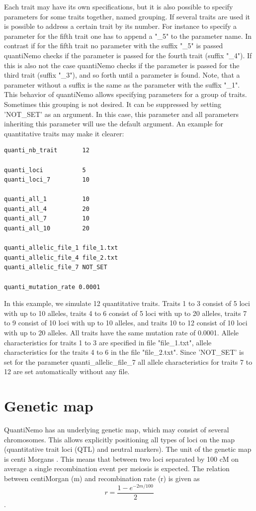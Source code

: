 \documentclass[letterpaper,12pt,oneside]{book}
\begin{document}
Each trait may have its own specifications, but it is also possible to specify parameters for some traits together, named grouping. If several traits are used it is possible to address a certain trait by its number. For instance to specify a parameter for the fifth trait one has to append a \textsf{"\_5"} to the parameter name. In contrast if for the fifth trait no parameter with the suffix \textsf{"\_5"} is passed quantiNemo checks if the parameter is passed for the fourth trait (suffix \textsf{"\_4"}). If this is also not the case quantiNemo checks if the parameter is passed for the third trait (suffix \textsf{"\_3"}), and so forth until a parameter is found. Note, that a parameter without a suffix is the same as the parameter with the suffix  \textsf{"\_1"}. This behavior of quantiNemo allows specifying parameters for a group of traits. Sometimes this grouping is not desired. It can be suppressed by setting 'NOT\_SET' as an argument. In this case, this parameter and all parameters inheriting this parameter will use the default argument. An example for quantitative traits may make it clearer:
\begin{lstlisting}[frame=single]
quanti_nb_trait       12
    
quanti_loci           5
quanti_loci_7         10

quanti_all_1          10
quanti_all_4          20
quanti_all_7          10
quanti_all_10         20

quanti_allelic_file_1 file_1.txt  
quanti_allelic_file_4 file_2.txt  
quanti_allelic_file_7 NOT_SET  

quanti_mutation_rate 0.0001
\end{lstlisting} 
In this example, we simulate 12 quantitative traits. Traits 1 to 3 consist of 5 loci with up to 10 alleles, traits 4 to 6 consist of 5 loci with up to 20 alleles, traits 7 to 9 consist of 10 loci with up to 10 alleles, and traits 10 to 12 consist of 10 loci with up to 20 alleles. All traits have the same mutation rate of 0.0001. Allele characteristics for traits 1 to 3 are specified in file "file\_1.txt", allele characteristics for the traits 4 to 6 in the file "file\_2.txt". Since 'NOT\_SET' is set for the parameter \textsf{ quanti\_allelic\_file\_7} all allele characteristics for traits 7 to 12 are set automatically without any file. \\

\section{Genetic map}\label{sec:geneticMap}
QuantiNemo has an underlying genetic map, which may consist of several chromosomes. This allows
explicitly positioning all types of loci on the map (quantitative trait loci (QTL) and neutral
markers). The unit of the genetic map is centi Morgans \citep[cM]{Haldane_1919}. This means that
between two loci separated by 100 cM on average a single recombination event per meiosis is expected.
The relation between centiMorgan (m) and recombination rate (r) is given as 
\[r=\frac{1-e^{-2m/100}}{2}\].
\end{document}
